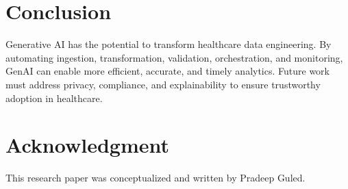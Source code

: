 \documentclass[conference]{IEEEtran}
\begin{document}
\section{Conclusion}
Generative AI has the potential to transform healthcare data engineering. By automating ingestion, transformation, validation, orchestration, and monitoring, GenAI can enable more efficient, accurate, and timely analytics. Future work must address privacy, compliance, and explainability to ensure trustworthy adoption in healthcare.

\section*{Acknowledgment}
This research paper was conceptualized and written by Pradeep Guled.



\end{document}

